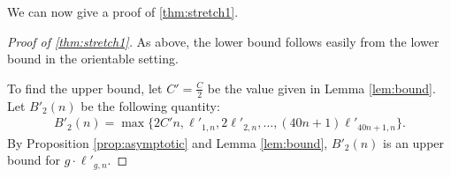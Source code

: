 We can now give a proof of \autoref{thm:stretch1}.


\begin{proof}[Proof of \autoref{thm:stretch1}]
As above, the lower bound follows easily from the lower bound in the orientable setting.  

  To find the upper bound, let $C'=\frac{C}{2}$ be the value given in Lemma \ref{lem:bound}. Let $B'_2(n)$ be the
  following quantity:
  \begin{align*}
    B'_2(n) = \max\{2C'n, \ell'_{1,n}, 2\ell'_{2,n}, \dots, (40n + 1)\ell'_{40n+1,n}\}.
  \end{align*}
  By Proposition \ref{prop:asymptotic} and Lemma \ref{lem:bound}, $B'_2(n)$ is an upper bound for $g\cdot \ell'_{g,n}$.
\end{proof}